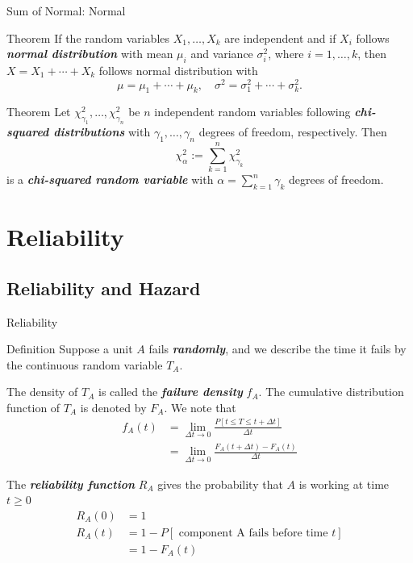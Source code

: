 \documentclass{beamer}
\newcommand{\bb}[1]{\textcolor{antiquefuchsia}{\textbf{\textit{#1}}}}
\begin{document}
\begin{frame}{Sum of Normal: Normal}
\begin{block}{Theorem}
If the random variables $X_{1}, \ldots, X_{k}$ are independent and if $X_{i}$ follows \bb{normal distribution} with mean $\mu_{i}$ and variance $\sigma_{i}^{2}$, where $i=1, \ldots, k$, then
$
X=X_{1}+\cdots+X_{k}
$
follows normal distribution with
$$
\mu=\mu_{1}+\cdots+\mu_{k}, \quad \sigma^{2}=\sigma_{1}^{2}+\cdots+\sigma_{k}^{2} .
$$
\end{block}
\begin{block}{Theorem}
Let $\chi_{\gamma_{1}}^{2}, \ldots, \chi_{\gamma_{n}}^{2}$ be $n$ independent random variables following \bb{chi-squared distributions} with $\gamma_{1}, \ldots, \gamma_{n}$ degrees of freedom, respectively. Then
$$
\chi_{\alpha}^{2}:=\sum_{k=1}^{n} \chi_{\gamma_{k}}^{2}
$$
is a \bb{chi-squared random variable} with $\alpha=\sum_{k=1}^{n} \gamma_{k}$ degrees of freedom.
\end{block}
\end{frame}

\section{Reliability}
\subsection{Reliability and Hazard}
\begin{frame}{Reliability}
\begin{block}{Definition}
Suppose a unit $A$ fails \bb{randomly}, and we describe the time it fails by the continuous random variable $T_{A}$.

The density of $T_{A}$ is called the \bb{failure density} $f_{A}$.
The cumulative distribution function of $T_{A}$ is denoted by $F_{A}$.
We note that
$$
\begin{aligned}
f_{A}(t) &=\lim _{\Delta t \rightarrow 0} \frac{P[t \leq T \leq t+\Delta t]}{\Delta t} \\
&=\lim _{\Delta t \rightarrow 0} \frac{F_{A}(t+\Delta t)-F_{A}(t)}{\Delta t}
\end{aligned}
$$

The \bb{reliability function} $R_{A}$ gives the probability that $A$ is working at time $t \geq 0$
$$
\begin{aligned}
R_{A}(0) &=1 \\
R_{A}(t) &=1-P[\text { component A fails before time } t] \\
&=1-F_{A}(t)
\end{aligned}
$$
\end{block}
\end{frame}
\end{document}
